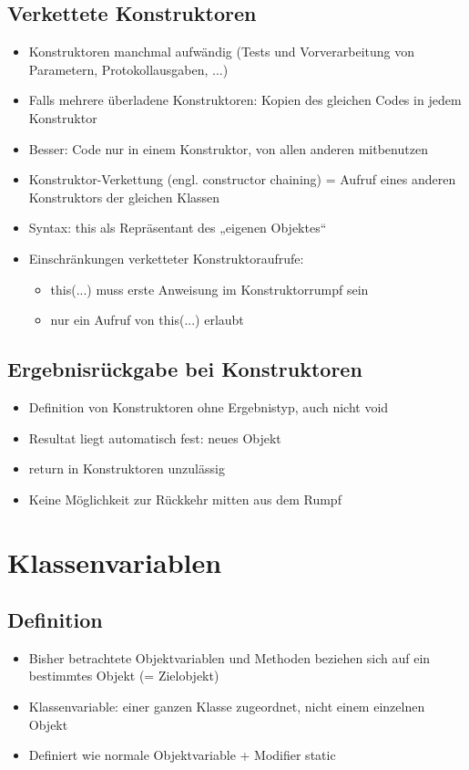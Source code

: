 \subsection{Verkettete Konstruktoren}
\begin{itemize}
\item Konstruktoren manchmal aufwändig (Tests und Vorverarbeitung von Parametern, Protokollausgaben, ...)
\item Falls mehrere überladene Konstruktoren: Kopien des gleichen Codes in jedem Konstruktor
\item Besser: Code nur in einem Konstruktor, von allen anderen mitbenutzen
\item Konstruktor-Verkettung (engl. constructor chaining) = Aufruf eines anderen Konstruktors der gleichen Klassen
\item Syntax: this als Repräsentant des „eigenen Objektes“
\item Einschränkungen verketteter Konstruktoraufrufe:
\begin{itemize}
\item this(...) muss erste Anweisung im Konstruktorrumpf sein
\item nur ein Aufruf von this(...) erlaubt
\end{itemize}
\end{itemize}

\subsection{Ergebnisrückgabe bei Konstruktoren}
\begin{itemize}
\item Definition von Konstruktoren ohne Ergebnistyp, auch nicht void
\item Resultat liegt automatisch fest: neues Objekt
\item return in Konstruktoren unzulässig
\item Keine Möglichkeit zur Rückkehr mitten aus dem Rumpf
\end{itemize}
%
%
%
\section{Klassenvariablen}
\subsection{Definition}
\begin{itemize}
\item Bisher betrachtete Objektvariablen und Methoden beziehen sich auf ein bestimmtes Objekt (= Zielobjekt)
\item Klassenvariable: einer ganzen Klasse zugeordnet, nicht einem einzelnen Objekt
\item Definiert wie normale Objektvariable + Modifier static
\end{itemize}

